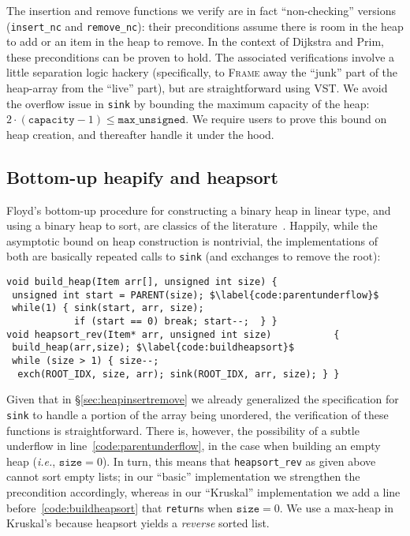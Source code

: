 The insertion and remove functions we verify are in fact ``non-checking'' versions (\texttt{insert\_nc} and \texttt{remove\_nc}): their preconditions assume there is room in the heap to add or an item in the heap to remove.  In the context of Dijkstra and Prim, these preconditions can be proven to hold.  The associated verifications involve a little separation logic hackery (specifically, to \textsc{Frame} away the ``junk'' part of the heap-array from the ``live'' part), but are straightforward using VST.  We avoid the overflow issue in \texttt{sink} by bounding the maximum capacity of the heap: $2\cdot(\texttt{capacity} - 1) \leq \texttt{max\_unsigned}$.  We require users to prove this bound on heap creation, and thereafter handle it under the hood.

\subsection{Bottom-up heapify and heapsort}

Floyd's bottom-up procedure for constructing a binary heap in linear type, and using a binary heap to sort, are classics of the literature~\cite{CLRS,Sedgewick}.  Happily, while the asymptotic bound on heap construction is nontrivial, the implementations of both are basically repeated calls to \texttt{sink} (and exchanges to remove the root):
\begin{lstlisting}
void build_heap(Item arr[], unsigned int size) {
 unsigned int start = PARENT(size); $\label{code:parentunderflow}$
 while(1) { sink(start, arr, size);
            if (start == 0) break; start--;  } }
void heapsort_rev(Item* arr, unsigned int size)           {
 build_heap(arr,size); $\label{code:buildheapsort}$
 while (size > 1) { size--;
  exch(ROOT_IDX, size, arr); sink(ROOT_IDX, arr, size); } }
\end{lstlisting}
Given that in \S\ref{sec:heapinsertremove} we already generalized the specification for \texttt{sink} to handle a portion of the array being unordered, the verification of these functions is straightforward.  There is, however, the possibility of a subtle underflow in line~\ref{code:parentunderflow}, in the case when building an empty heap (\emph{i.e.}, $\texttt{size}=0$).  In turn, this means that \texttt{heapsort\_rev} as given above cannot sort empty lists; in our ``basic'' implementation we strengthen the precondition accordingly, whereas in our ``Kruskal'' implementation we add a line before~\ref{code:buildheapsort} that \texttt{return}s when $\texttt{size}=0$.  We use a max-heap in Kruskal's because heapsort yields a \emph{reverse} sorted list.

